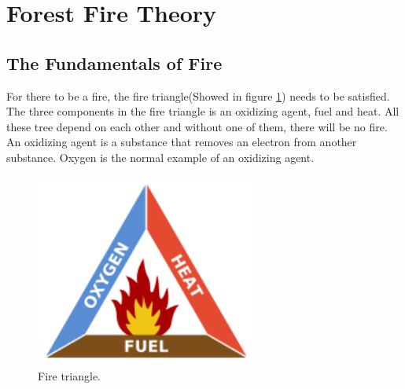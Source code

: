\section{Forest Fire Theory}
\subsection{The Fundamentals of Fire}
For there to be a fire, the fire triangle(Showed in figure \ref{fig:fire-triangle}) needs to be satisfied. The three components in the fire triangle is an oxidizing agent, fuel and heat. All these tree depend on each other and without one of them, there will be no fire. An oxidizing agent is a substance that removes an electron from another substance. Oxygen is the normal example of an oxidizing agent.
\begin{figure}[here]
  \centering
      \includegraphics[width=0.65\textwidth]{theory/graphics/fire-triangle.png}
  \caption{ Fire triangle.\cite{fire-tirangleimage} }
  \label{fig:fire-triangle}
\end{figure}
